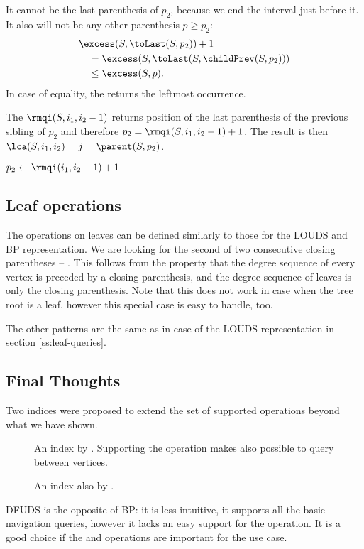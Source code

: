 It cannot be the last parenthesis of $p_2$, because we end the interval just before it.
It also will not be any other parenthesis $p \ge p_2$:
\begin{align*}
	& \excess(S, \toLast(S, p_2)) + 1 \\
	&\quad = \excess(S, \toLast(S, \childPrev(S, p_2))) \\
	&\quad \le \excess(S, p).
\end{align*}
In case of equality, the \rmqi{} returns the leftmost occurrence.

The $\rmqi(S, i_1, i_2 - 1)$ returns position of the last parenthesis of the previous sibling of $p_2$ and therefore $p_2 = \rmqi(S, i_1, i_2 - 1) + 1$.
The result is then $\lca(S, i_1, i_2) = j = \parent(S, p_2)$.

\begin{algorithm}
\begin{algorithmic}
		\State {}
		\State {}
	\Else
		\State $p_2 \gets \rmqi(i_1, i_2 - 1) + 1$
		\State {}
	\EndIf
\EndFunction
\end{algorithmic}
\end{algorithm}

\subsection{Leaf operations}

The operations on leaves can be defined similarly to those for the LOUDS and BP representation.
We are looking for the second of two consecutive closing parentheses -- \str{))}.
This follows from the property that the degree sequence of every vertex is preceded by a closing parenthesis, and the degree sequence of leaves is only the closing parenthesis.
Note that this does not work in case when the tree root is a leaf, however this special case is easy to handle, too.

The other patterns are the same as in case of the LOUDS representation in section \ref{ss:leaf-queries}.

\subsection{Final Thoughts}

Two indices were proposed to extend the set of supported operations beyond what we have shown.
\begin{description}
	\item[\dep{}]
	An index by \cite{jansson2012ultra}.
	Supporting the operation \dep{} makes also possible to query \distance{} between vertices.
	
	\item[\levelAncestor{}]
	An index also by \cite{jansson2012ultra}.
\end{description}

DFUDS is the opposite of BP: it is less intuitive, it supports all the basic navigation queries, however it lacks an easy support for the \dep{} operation.
It is a good choice if the \preRank{} and \childAny{} operations are important for the use case.